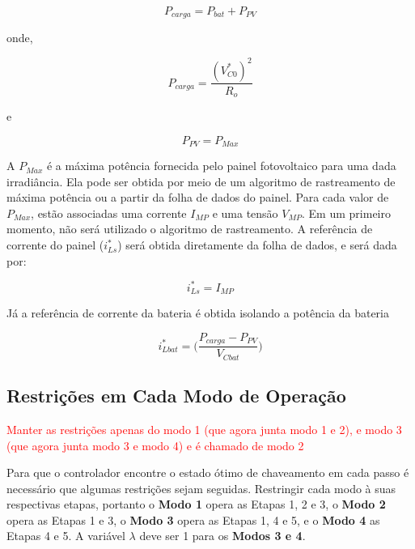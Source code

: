 \begin{equation}
    P_{carga} = P_{bat} + P_{PV}    
\end{equation}

onde, 

\begin{equation}
    P_{carga} =  \frac{(V^*_{C0})^2}{R_o}  
\end{equation}

e 

\begin{equation}
    P_{PV} =  P_{Max}  
\end{equation}

A $P_{Max}$ é a máxima potência fornecida pelo painel fotovoltaico para uma dada irradiância. Ela pode ser obtida por meio de um algoritmo de rastreamento de máxima potência ou a partir da folha de dados do painel. Para cada valor de $P_{Max}$, estão associadas uma corrente $I_{MP}$ e uma tensão $V_{MP}$. Em um primeiro momento, não será utilizado o algoritmo de rastreamento. A referência de corrente do painel ($i_{Ls}^*$) será obtida diretamente da folha de dados, e será dada por:

\begin{equation}
    i_{Ls}^* = I_{MP}
\end{equation}

Já a referência de corrente da bateria é obtida isolando a potência da bateria

\begin{equation}
i_{Lbat}^* = \bigg(\frac{P_{carga} - P_{PV}}{V_{Cbat}} \bigg)
\end{equation}




\subsection{Restrições em Cada Modo de Operação}

\textcolor{red}{Manter as restrições apenas do modo 1 (que agora junta modo 1 e 2), e modo 3 (que agora junta modo 3 e modo 4) e é chamado de modo 2}

Para que o controlador encontre o estado ótimo de chaveamento em cada passo é necessário que algumas restrições sejam seguidas. Restringir cada modo à suas respectivas etapas, portanto o \textbf{Modo 1} opera as Etapas 1, 2 e 3, o \textbf{Modo 2} opera as Etapas 1 e 3, o \textbf{Modo 3} opera as Etapas 1, 4 e 5, e o \textbf{Modo 4} as Etapas 4 e 5. A variável $\lambda$ deve ser 1 para os \textbf{Modos 3 e 4}.

